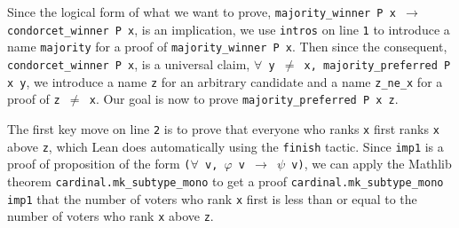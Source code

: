 \documentclass[runningheads]{llncs}
\begin{document}
Since the logical form of what we want to prove, \texttt{majority\_winner P x $\to$ condorcet\_winner P x}, is an implication, we use \texttt{intros} on line \texttt{1} to introduce a name \texttt{majority} for a proof of \texttt{majority\_winner P x}. Then since the consequent, \texttt{condorcet\_winner P x}, is a universal claim, \texttt{$\forall$ y $\neq$ x, majority\_preferred  P x~y}, we introduce a name \texttt{z} for an arbitrary candidate and a name \texttt{z\_ne\_x} for a proof of \texttt{z $\neq$ x}. Our goal is now to prove \texttt{majority\_preferred P x z}. %


The first key move on line \texttt{2} is to prove that everyone who ranks \texttt{x} first ranks \texttt{x} above \texttt{z}, which Lean  does automatically using the \texttt{finish} tactic. Since \texttt{imp1} is a proof of proposition of the form \texttt{($\forall$ v, $\varphi$ v $\to$ $\psi$ v)}, we can apply the Mathlib theorem \texttt{cardinal.mk\_subtype\_mono} to get a proof \texttt{cardinal.mk\_subtype\_mono imp1} that the number of voters who rank \texttt{x} first is less than or equal to the number of voters who rank \texttt{x} above \texttt{z}.%
\end{document}
